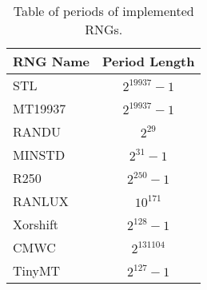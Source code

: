 \begin{table}[tb]
    \caption{Table of periods of implemented RNGs.}
    \label{tab:period}
    \begin{center}
        \begin{tabular}{l|c}
        \hline
        \hline
\textbf{RNG Name} & \textbf{Period Length} \\
        \hline
STL               & $2^{19937}-1$  \\
MT19937           & $2^{19937}-1$  \\
RANDU             & $2^{29}$       \\
MINSTD            & $2^{31}-1$     \\
R250              & $2^{250}-1$    \\
RANLUX            & $10^{171}$       \\
Xorshift          & $2^{128}-1$    \\
CMWC              & $2^{131104}$   \\
TinyMT            & $2^{127}-1$    \\
        \hline
        \hline
        \end{tabular}
    \end{center}
\end{table}
